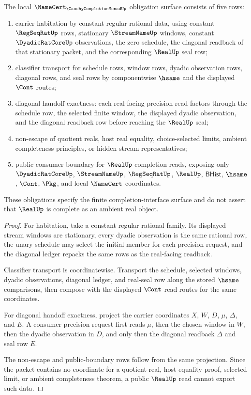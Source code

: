 \begin{theorem}
\label{thm:cauchy-completion-monad-namecert-obligations}
The local $\NameCert_{\CauchyCompletionMonadUp}$ obligation surface consists of five rows:
\begin{enumerate}
\item carrier habitation by constant regular rational data, using constant $\RegSeqRatUp$ rows, stationary $\StreamNameUp$ windows, constant $\DyadicRatCoreUp$ observations, the zero schedule, the diagonal readback of that stationary packet, and the corresponding $\RealUp$ seal row;
\item classifier transport for schedule rows, window rows, dyadic observation rows, diagonal rows, and seal rows by componentwise $\hsame$ and the displayed $\Cont$ routes;
\item diagonal handoff exactness: each real-facing precision read factors through the schedule row, the selected finite window, the displayed dyadic observation, and the diagonal readback row before reaching the $\RealUp$ seal;
\item non-escape of quotient reals, host real equality, choice-selected limits, ambient completeness principles, or hidden stream representatives;
\item public consumer boundary for $\RealUp$ completion reads, exposing only $\DyadicRatCoreUp$, $\StreamNameUp$, $\RegSeqRatUp$, $\RealUp$, $\mathsf{BHist}$, $\hsame$, $\Cont$, $\Pkg$, and local $\NameCert$ coordinates.
\end{enumerate}
These obligations specify the finite completion-interface surface and do not assert that $\RealUp$ is complete as an ambient real object.
\end{theorem}
\begin{proof}
For habitation, take a constant regular rational family. Its displayed stream windows are stationary, every dyadic observation is the same rational row, the unary schedule may select the initial member for each precision request, and the diagonal ledger repacks the same rows as the real-facing readback.

Classifier transport is coordinatewise. Transport the schedule, selected windows, dyadic observations, diagonal ledger, and real-seal row along the stored $\hsame$ comparisons, then compose with the displayed $\Cont$ read routes for the same coordinates.

For diagonal handoff exactness, project the carrier coordinates $X$, $W$, $D$, $\mu$, $\Delta$, and $E$. A consumer precision request first reads $\mu$, then the chosen window in $W$, then the dyadic observation in $D$, and only then the diagonal readback $\Delta$ and seal row $E$.

The non-escape and public-boundary rows follow from the same projection. Since the packet contains no coordinate for a quotient real, host equality proof, selected limit, or ambient completeness theorem, a public $\RealUp$ read cannot export such data.
\end{proof}

